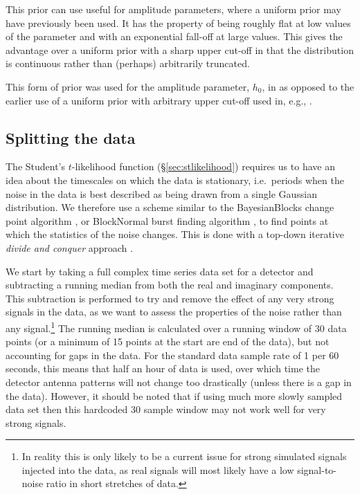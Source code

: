This prior can use useful for amplitude parameters, where a uniform prior may have previously been used. It has the property of being roughly
flat at low values of the parameter and with an exponential fall-off at large values. This gives the advantage over a uniform prior with a
sharp upper cut-off in that the distribution is continuous rather than (perhaps) arbitrarily truncated.

This form of prior was used for the \gw amplitude parameter, $h_0$, in \citet{2017arXiv170107709T} as opposed to the earlier use of
a uniform prior with arbitrary upper cut-off used in, e.g., \citet{2014ApJ...785..119A}.

\subsection{Splitting the data}\label{sec:splitting}

The Student's $t$-likelihood function (\S\ref{sec:stlikelihood}) requires us to have an idea about the timescales on which the data is
stationary, i.e.\ periods when the noise in the data is best described as being drawn from a single
Gaussian distribution. We therefore use a scheme similar to the BayesianBlocks change point algorithm
\citep{1998ApJ...504..405S}, or BlockNormal \gw burst finding algorithm \citep{2004CQGra..21S1705M}, to find points at which the statistics of the
noise changes. This is done with a top-down iterative {\it divide and conquer} approach \citep{2000physics...9033S}.

We start by taking a full complex time series data set for a detector and subtracting a running median from both
the real and imaginary components. This
subtraction is performed to try and remove the effect of any very strong signals in the data, as we want to
assess the properties of the noise rather than any signal.\footnote{In reality this is only likely to be a current issue for strong
simulated signals injected into the data, as real signals will most likely have a low signal-to-noise ratio in short stretches of data.} The running median is calculated over a running window
of 30 data points (or a minimum of 15 points at the start are end of the data), but not accounting for gaps in the data.
For the standard data sample rate of
1 per 60 seconds, this means that half an hour of data is used, over which time the detector antenna patterns will not change
too drastically (unless there is a gap in the data). However, it should be noted that if using much more slowly sampled data set
then this hardcoded 30 sample window may not work well for very strong signals.

